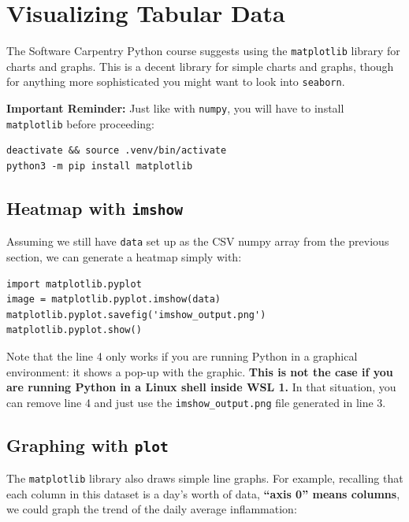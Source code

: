 \section{Visualizing Tabular Data}
\begin{multicols*}{2}

The Software Carpentry Python course suggests using the \texttt{matplotlib} library for charts and graphs. This is a decent library for simple charts and graphs, though for anything more sophisticated you might want to look into \texttt{seaborn}.

\textbf{Important Reminder:} Just like with \texttt{numpy}, you will have to install \texttt{matplotlib} before proceeding:

\vspace{-4mm}
\begin{verbatim}
deactivate && source .venv/bin/activate
python3 -m pip install matplotlib
\end{verbatim}

\subsection{Heatmap with \texttt{imshow}}

Assuming we still have \texttt{data} set up as the CSV numpy array from the previous section, we can generate a heatmap simply with:

\vspace{-4mm}
\begin{verbatim}
import matplotlib.pyplot
image = matplotlib.pyplot.imshow(data)
matplotlib.pyplot.savefig('imshow_output.png')
matplotlib.pyplot.show()
\end{verbatim}

Note that the line 4 only works if you are running Python in a graphical environment: it shows a pop-up with the graphic. \textbf{This is not the case if you are running Python in a Linux shell inside WSL 1.} In that situation, you can remove line 4 and just use the \texttt{imshow_output.png} file generated in line 3.

\subsection{Graphing with \texttt{plot}}

The \texttt{matplotlib} library also draws simple line graphs. For example, recalling that each column in this dataset is a day's worth of data, \textbf{``axis 0'' means columns}, we could graph the trend of the daily average inflammation:


\end{multicols*}
